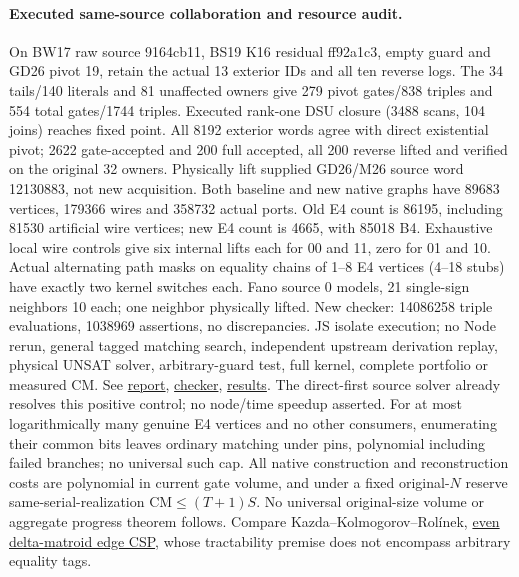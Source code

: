 \documentclass[11pt]{article}
\begin{document}
\paragraph{Executed same-source collaboration and resource audit.}
On BW17 raw source 9164cb11, BS19 K16 residual ff92a1c3, empty guard and GD26 pivot 19, retain the actual 13 exterior IDs and all ten reverse logs. The 34 tails/140 literals and 81 unaffected owners give 279 pivot gates/838 triples and 554 total gates/1744 triples. Executed rank-one DSU closure (3488 scans, 104 joins) reaches fixed point. All 8192 exterior words agree with direct existential pivot; 2622 gate-accepted and 200 full accepted, all 200 reverse lifted and verified on the original 32 owners. Physically lift supplied GD26/M26 source word 12130883, not new acquisition. Both baseline and new native graphs have 89683 vertices, 179366 wires and 358732 actual ports. Old E4 count is 86195, including 81530 artificial wire vertices; new E4 count is 4665, with 85018 B4. Exhaustive local wire controls give six internal lifts each for 00 and 11, zero for 01 and 10. Actual alternating path masks on equality chains of 1--8 E4 vertices (4--18 stubs) have exactly two kernel switches each. Fano source 0 models, 21 single-sign neighbors 10 each; one neighbor physically lifted. New checker: 14086258 triple evaluations, 1038969 assertions, no discrepancies. JS isolate execution; no Node rerun, general tagged matching search, independent upstream derivation replay, physical UNSAT solver, arbitrary-guard test, full kernel, complete portfolio or measured CM. See \href{https://github.com/j15marti/pnp/commit/5f54f82e70b45a5b6dff998a7d138a40ac9c8cec}{report}, \href{https://github.com/j15marti/pnp/commit/754adb96bb8ee11557a70c3e1f0e950766d71872}{checker}, \href{https://github.com/j15marti/pnp/commit/662cc11d3e6402df4bc097dae68615748c1b493e}{results}. The direct-first source solver already resolves this positive control; no node/time speedup asserted. For at most logarithmically many genuine E4 vertices and no other consumers, enumerating their common bits leaves ordinary matching under pins, polynomial including failed branches; no universal such cap. All native construction and reconstruction costs are polynomial in current gate volume, and under a fixed original-$N$ reserve same-serial-realization $\mathrm{CM}\le(T+1)S$. No universal original-size volume or aggregate progress theorem follows. Compare Kazda--Kolmogorov--Rol\'inek, \href{https://doi.org/10.1145/3230649}{even delta-matroid edge CSP}, whose tractability premise does not encompass arbitrary equality tags.
\end{document}
